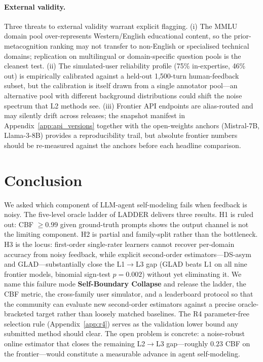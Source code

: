 \documentclass[11pt]{article}
\begin{document}
\paragraph{External validity.} Three threats to external validity warrant explicit flagging. (i) The MMLU domain pool over-represents Western/English educational content, so the prior-metacognition ranking may not transfer to non-English or specialised technical domains; replication on multilingual or domain-specific question pools is the cleanest test. (ii) The simulated-user reliability profile (75\% in-expertise, 46\% out) is empirically calibrated against a held-out 1,500-turn human-feedback subset, but the calibration is itself drawn from a single annotator pool---an alternative pool with different background distributions could shift the noise spectrum that L2 methods see. (iii) Frontier API endpoints are alias-routed and may silently drift across releases; the snapshot manifest in Appendix~\ref{app:api_versions} together with the open-weights anchors (Mistral-7B, Llama-3-8B) provides a reproducibility trail, but absolute frontier numbers should be re-measured against the anchors before each headline comparison.


\section{Conclusion}
\label{sec:conclusion}

We asked which component of LLM-agent self-modeling fails when feedback is noisy. The five-level oracle ladder of LADDER delivers three results. H1 is ruled out: CBF $\geq 0.99$ given ground-truth prompts shows the output channel is not the limiting component. H2 is partial and family-split rather than the bottleneck. H3 is the locus: first-order single-rater learners cannot recover per-domain accuracy from noisy feedback, while explicit second-order estimators---DS-asym and GLAD---substantially close the L1$\to$L3 gap (GLAD beats L1 on all nine frontier models, binomial sign-test $p=0.002$) without yet eliminating it. We name this failure mode \textbf{Self-Boundary Collapse} and release the ladder, the CBF metric, the cross-family user simulator, and a leaderboard protocol so that the community can evaluate new second-order estimators against a precise oracle-bracketed target rather than loosely matched baselines. The R4 parameter-free selection rule (Appendix~\ref{app:r4}) serves as the validation lower bound any submitted method should clear. The open problem is concrete: a noise-robust online estimator that closes the remaining L2$\to$L3 gap---roughly $0.23$ CBF on the frontier---would constitute a measurable advance in agent self-modeling.
\end{document}
